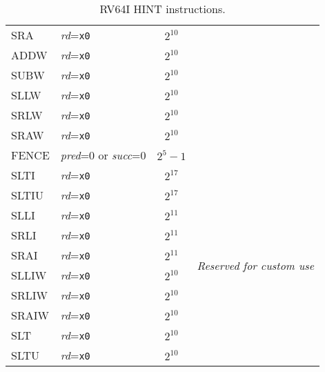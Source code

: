 \begin{table}[hbt]
\begin{tabular}{|l|l|c|l|}
  SRA                   & {\em rd}={\tt x0}                           & $2^{10}$                    & \\ \cline{1-3}
  ADDW                  & {\em rd}={\tt x0}                           & $2^{10}$                    & \\ \cline{1-3}
  SUBW                  & {\em rd}={\tt x0}                           & $2^{10}$                    & \\ \cline{1-3}
  SLLW                  & {\em rd}={\tt x0}                           & $2^{10}$                    & \\ \cline{1-3}
  SRLW                  & {\em rd}={\tt x0}                           & $2^{10}$                    & \\ \cline{1-3}
  SRAW                  & {\em rd}={\tt x0}                           & $2^{10}$                    & \\ \cline{1-3}
  FENCE                 & {\em pred}=0 or {\em succ}=0                & $2^{5}-1$                   & \\ \hline \hline
  SLTI                  & {\em rd}={\tt x0}                           & $2^{17}$                    & \multirow{10}{*}{\em Reserved for custom use} \\ \cline{1-3}
  SLTIU                 & {\em rd}={\tt x0}                           & $2^{17}$                    & \\ \cline{1-3}
  SLLI                  & {\em rd}={\tt x0}                           & $2^{11}$                    & \\ \cline{1-3}
  SRLI                  & {\em rd}={\tt x0}                           & $2^{11}$                    & \\ \cline{1-3}
  SRAI                  & {\em rd}={\tt x0}                           & $2^{11}$                    & \\ \cline{1-3}
  SLLIW                 & {\em rd}={\tt x0}                           & $2^{10}$                    & \\ \cline{1-3}
  SRLIW                 & {\em rd}={\tt x0}                           & $2^{10}$                    & \\ \cline{1-3}
  SRAIW                 & {\em rd}={\tt x0}                           & $2^{10}$                    & \\ \cline{1-3}
  SLT                   & {\em rd}={\tt x0}                           & $2^{10}$                    & \\ \cline{1-3}
  SLTU                  & {\em rd}={\tt x0}                           & $2^{10}$                    & \\ \hline
\end{tabular}
\caption{RV64I HINT instructions.}
\label{tab:rv64i-hints}
\end{table}
